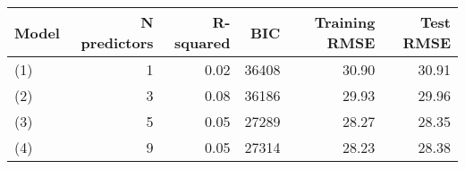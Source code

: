 \begin{tabular}{lrrrrr}
  \toprule
Model & N predictors & R-squared & BIC & Training RMSE & Test RMSE \\ 
  \midrule
(1) & 1 & 0.02 & 36408 & 30.90 & 30.91 \\ 
  (2) & 3 & 0.08 & 36186 & 29.93 & 29.96 \\ 
  (3) & 5 & 0.05 & 27289 & 28.27 & 28.35 \\ 
  (4) & 9 & 0.05 & 27314 & 28.23 & 28.38 \\ 
   \bottomrule
\end{tabular}

